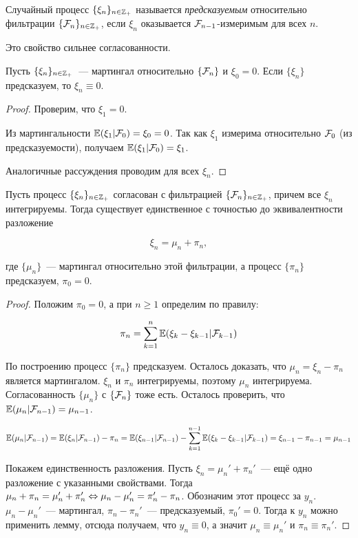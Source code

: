 \begin{definition}
    Случайный процесс $\{\xi_n\}_{n \in \mathbb{Z}_+}$ называется \textit{предсказуемым}
    относительно фильтрации $\{\mathcal{F}_n\}_{n \in \mathbb{Z}_+}$, если $\xi_n$ 
    оказывается $\mathcal{F}_{n - 1}$-измеримым для всех $n$.
\end{definition}

\begin{note}
    Это свойство сильнее согласованности.
\end{note}

\begin{lemma}
    Пусть $\{\xi_n\}_{n \in \mathbb{Z}_+}$~--- мартингал относительно $\{\mathcal{F}_n\}$ и $\xi_0 = 0$. Если $\{\xi_n\}$ предсказуем, то $\xi_n \equiv 0$.
\end{lemma}

\begin{proof}
    Проверим, что $\xi_1 = 0$.

    Из мартингальности $\operatorname{\mathbb{E}}(\xi_1 | \mathcal{F}_0) = \xi_0 = 0$. Так как $\xi_1$ измерима относительно $\mathcal{F}_0$ (из предсказуемости), получаем $\operatorname{\mathbb{E}}(\xi_1 | \mathcal{F}_0) = \xi_1$.

    Аналогичные рассуждения проводим для всех $\xi_n$.
\end{proof}

\begin{theorem}
    Пусть процесс $\{\xi_n\}_{n \in \mathbb{Z}_+}$ согласован с фильтрацией $\{\mathcal{F}_n\}_{n \in \mathbb{Z}_+}$, причем все $\xi_n$ интегрируемы. Тогда существует единственное с точностью до эквивалентности разложение

    \[
    \xi_n = \mu_n + \pi_n,
    \]

    где $\{\mu_n\}$~--- мартингал относительно этой фильтрации, а процесс $\{\pi_n\}$ предсказуем, $\pi_0 = 0$.
\end{theorem}

\begin{proof}
     Положим $\pi_0 = 0$, а при $n \geq 1$ определим по правилу:

     \[
     \pi_n = \sum_{k = 1}^n \operatorname{\mathbb{E}}(\xi_k - \xi_{k - 1} | \mathcal{F}_{k - 1})
     \]

    По построению процесс $\{\pi_n\}$ предсказуем. Осталось доказать, что
    $\mu_n = \xi_n - \pi_n$ является мартингалом. $\xi_n$ и $\pi_n$ интегрируемы, поэтому $\mu_n$ интегрируема. Согласованность $\{\mu_n\}$ с $\{\mathcal{F}_n\}$ тоже есть. Осталось проверить, что $\operatorname{\mathbb{E}}(\mu_n | \mathcal{F}_{n - 1}) = \mu_{n - 1}$.

    \[
    \operatorname{\mathbb{E}}(\mu_n | \mathcal{F}_{n - 1}) = \operatorname{\mathbb{E}}(\xi_n | \mathcal{F}_{n - 1}) - \pi_n =
    \operatorname{\mathbb{E}}(\xi_{n - 1} | \mathcal{F}_{n - 1}) - \sum_{k = 1}^{n - 1} \operatorname{\mathbb{E}}(\xi_k - \xi_{k - 1} | \mathcal{F}_{k - 1}) = \xi_{n - 1} - \pi_{n - 1} = \mu_{n - 1}
    \]

    Покажем единственность разложения. Пусть $\xi_n = \mu_n' + \pi_n'$~--- ещё одно разложение с указанными свойствами. Тогда 
    $\mu_n + \pi_n = \mu_n' + \pi_n' \Leftrightarrow \mu_n - \mu_n' = \pi_n' - \pi_n$. Обозначим этот процесс за $y_n$.
    $\mu_n - \mu_n'$~--- мартингал, $\pi_n - \pi_n'$~--- предсказуемый, $\pi_0' = 0$. Тогда к $y_n$ можно применить лемму, отсюда получаем, что $y_n \equiv 0$,
    а значит $\mu_n \equiv \mu_n'$ и $\pi_n \equiv \pi_n'$.
\end{proof}